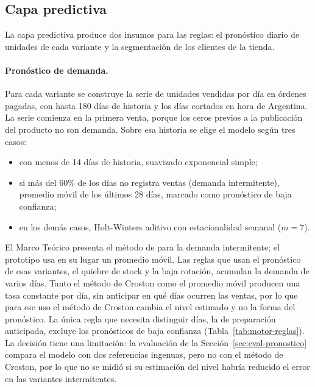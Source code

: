 \subsection{Capa predictiva}
\label{sec:motor-predictiva}

La capa predictiva produce dos insumos para las reglas: el pronóstico diario de unidades de cada variante y la segmentación de los clientes de la tienda.

\paragraph{Pronóstico de demanda.} Para cada variante se construye la serie de unidades vendidas por día en órdenes pagadas, con hasta 180 días de historia y los días cortados en hora de Argentina. La serie comienza en la primera venta, porque los ceros previos a la publicación del producto no son demanda. Sobre esa historia se elige el modelo según tres casos:

\begin{itemize}
    \item con menos de 14 días de historia, suavizado exponencial simple;
    \item si más del 60\% de los días no registra ventas (demanda intermitente), promedio móvil de los últimos 28 días, marcado como pronóstico de baja confianza;
    \item en los demás casos, Holt-Winters aditivo con estacionalidad semanal ($m = 7$).
\end{itemize}

El Marco Teórico presenta el método de \textcite{Croston1972} para la demanda intermitente; el prototipo usa en su lugar un promedio móvil. Las reglas que usan el pronóstico de esas variantes, el quiebre de stock y la baja rotación, acumulan la demanda de varios días. Tanto el método de Croston como el promedio móvil producen una tasa constante por día, sin anticipar en qué días ocurren las ventas, por lo que para ese uso el método de Croston cambia el nivel estimado y no la forma del pronóstico. La única regla que necesita distinguir días, la de preparación anticipada, excluye los pronósticos de baja confianza (Tabla~\ref{tab:motor-reglas}). La decisión tiene una limitación: la evaluación de la Sección~\ref{sec:eval-pronostico} compara el modelo con dos referencias ingenuas, pero no con el método de Croston, por lo que no se midió si su estimación del nivel habría reducido el error en las variantes intermitentes.

